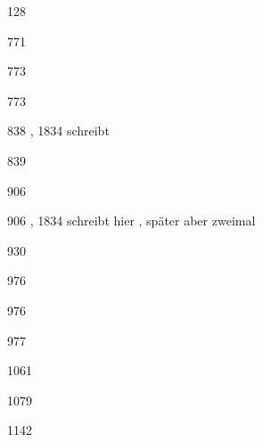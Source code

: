 \documentclass{book}
\begin{document}
128 \par
771 \par
773 \par
773 \par
838 , 1834 schreibt \par
839 \par
906 \par
906 , 1834 schreibt hier , später aber zweimal \par
930 \par
976 \par
976 \par
977 \par
1061 \par
1079 \par
1142 \par
\end{document}
